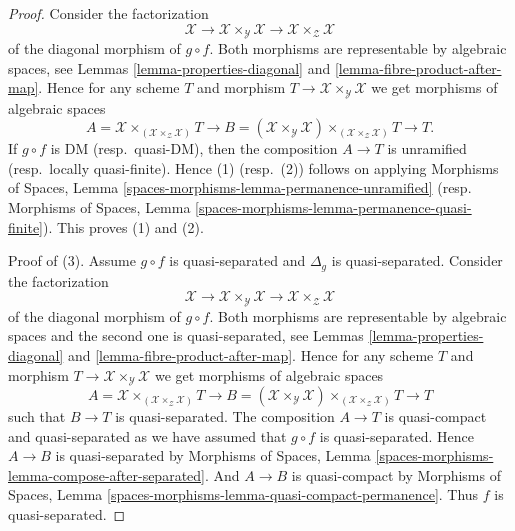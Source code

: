 \begin{proof}
Consider the factorization
$$
\mathcal{X} \to
\mathcal{X} \times_\mathcal{Y} \mathcal{X} \to
\mathcal{X} \times_\mathcal{Z} \mathcal{X}
$$
of the diagonal morphism of $g \circ f$. Both morphisms are representable by
algebraic spaces, see
Lemmas \ref{lemma-properties-diagonal} and
\ref{lemma-fibre-product-after-map}.
Hence for any scheme $T$ and morphism
$T \to \mathcal{X} \times_\mathcal{Y} \mathcal{X}$
we get morphisms of algebraic spaces
$$
A = \mathcal{X} \times_{(\mathcal{X} \times_\mathcal{Z} \mathcal{X})} T
\longrightarrow
B = (\mathcal{X} \times_\mathcal{Y} \mathcal{X})
\times_{(\mathcal{X} \times_\mathcal{Z} \mathcal{X})} T
\longrightarrow
T.
$$
If $g \circ f$ is DM (resp.\ quasi-DM), then the composition $A \to T$
is unramified (resp.\ locally quasi-finite). Hence (1) (resp.\ (2))
follows on applying
Morphisms of Spaces, Lemma
\ref{spaces-morphisms-lemma-permanence-unramified}
(resp.
Morphisms of Spaces,
Lemma \ref{spaces-morphisms-lemma-permanence-quasi-finite}).
This proves (1) and (2).

\medskip\noindent
Proof of (3). Assume $g \circ f$ is quasi-separated and $\Delta_g$ is
quasi-separated. Consider the factorization
$$
\mathcal{X} \to
\mathcal{X} \times_\mathcal{Y} \mathcal{X} \to
\mathcal{X} \times_\mathcal{Z} \mathcal{X}
$$
of the diagonal morphism of $g \circ f$. Both morphisms are
representable by algebraic spaces and the second one is quasi-separated, see
Lemmas \ref{lemma-properties-diagonal} and
\ref{lemma-fibre-product-after-map}.
Hence for any scheme $T$ and morphism
$T \to \mathcal{X} \times_\mathcal{Y} \mathcal{X}$
we get morphisms of algebraic spaces
$$
A = \mathcal{X} \times_{(\mathcal{X} \times_\mathcal{Z} \mathcal{X})} T
\longrightarrow
B = (\mathcal{X} \times_\mathcal{Y} \mathcal{X})
\times_{(\mathcal{X} \times_\mathcal{Z} \mathcal{X})} T
\longrightarrow
T
$$
such that $B \to T$ is quasi-separated.
The composition $A \to T$ is quasi-compact and quasi-separated
as we have assumed that $g \circ f$ is quasi-separated.
Hence $A \to B$ is quasi-separated by
Morphisms of Spaces,
Lemma \ref{spaces-morphisms-lemma-compose-after-separated}.
And $A \to B$ is quasi-compact by
Morphisms of Spaces,
Lemma \ref{spaces-morphisms-lemma-quasi-compact-permanence}.
Thus $f$ is quasi-separated.


\end{proof}
